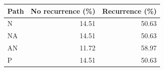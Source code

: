 \begin{tabular}{lrr}
\toprule
Path & No recurrence (\%) & Recurrence (\%) \\
\midrule
N & 14.51 & 50.63 \\
NA & 14.51 & 50.63 \\
AN & 11.72 & 58.97 \\
P & 14.51 & 50.63 \\
\bottomrule
\end{tabular}
